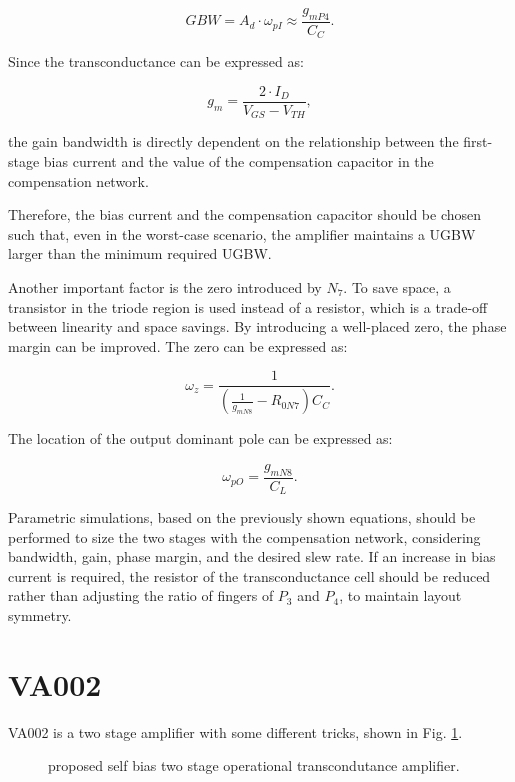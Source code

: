 \documentclass[12pt]{article}
\begin{document}
\begin{equation} GBW = A_d \cdot \omega_{pI} \approx \frac{g_{mP4}}{C_C}. \end{equation}

Since the transconductance can be expressed as:

\begin{equation} g_m = \frac{2 \cdot I_D}{V_{GS} - V_{TH}}, \end{equation}

the gain bandwidth is directly dependent on the relationship between the first-stage bias current and the value of the compensation capacitor in the compensation network. 

Therefore, the bias current and the compensation capacitor should be chosen such that, even in the worst-case scenario, the amplifier maintains a UGBW larger than the minimum required UGBW.

Another important factor is the zero introduced by $N_7$. To save space, a transistor in the triode region is used instead of a resistor, which is a trade-off between linearity and space savings. By introducing a well-placed zero, the phase margin can be improved. The zero can be expressed as:

\begin{equation} \omega_z = \frac{1}{\left(\frac{1}{g_{mN8}} - R_{0N7}\right)C_C}. \end{equation}

The location of the output dominant pole can be expressed as:

\begin{equation} \omega_{pO} = \frac{g_{mN8}}{C_L}. \end{equation}

Parametric simulations, based on the previously shown equations, should be performed to size the two stages with the compensation network, considering bandwidth, gain, phase margin, and the desired slew rate. If an increase in bias current is required, the resistor of the transconductance cell should be reduced rather than adjusting the ratio of fingers of $P_3$ and $P_4$, to maintain layout symmetry.


\newpage

\section{VA002}
VA002 is a two stage amplifier with some different tricks, shown in Fig. \ref{VA002}.
\begin{figure}[H]
        \centering
        
        \caption{proposed self bias two stage operational transcondutance amplifier.}
        \label{VA002}
\end{figure}
\end{document}
